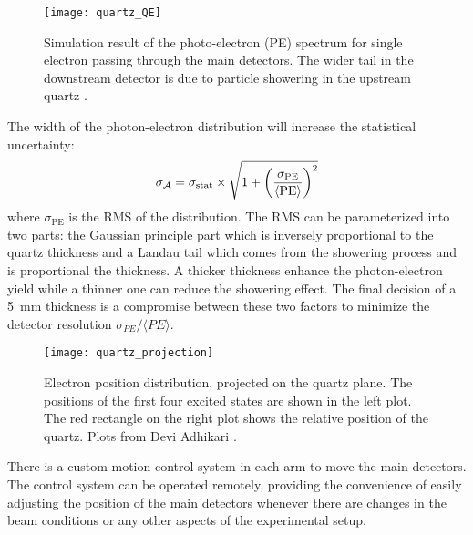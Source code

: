 \begin{figure}[!h]
    \centering
    \texttt{[image: quartz\_QE]}
    \caption[photo-electron spectrum of quartz]
    {Simulation result of the photo-electron (PE) spectrum for single electron
    passing through the main detectors. The wider tail in the downstream
    detector is due to particle showering in the upstream quartz \cite{Devi2021}. 
    }
\end{figure}
The width of the photon-electron distribution will increase the statistical uncertainty:
\begin{equation}
    \sigma_{\mathcal{A}} = \sigma_{\text{stat}} \times \sqrt{1 + \left( \frac{\sigma_{\text{PE}}}{\langle \text{PE} \rangle }\right)^2}
\end{equation}
where $\sigma_{\text{PE}}$ is the RMS of the distribution. The RMS can be parameterized
into two parts: the Gaussian principle part which is inversely proportional to
the quartz thickness and a Landau tail which comes from the showering process
and is proportional the thickness. A thicker thickness enhance the 
photon-electron yield while a thinner one can reduce the showering effect.
The final decision of a 5~mm thickness is a compromise between these two factors 
to minimize the detector resolution $\sigma_{PE}/\langle PE \rangle$. 

\begin{figure}[!h]
    \centering
    \texttt{[image: quartz\_projection]}
    \caption[Electron position distribution, projected on the quartz plane.]
    {Electron position distribution, projected on the quartz plane. 
    The positions of the first four excited states are shown in the left plot. 
    The red rectangle on the right plot shows the relative position of the quartz.
    Plots from Devi Adhikari \cite{Devi2021}.}
\end{figure}

There is a custom motion control system in each arm to move the main detectors.
The control system can be operated remotely, providing the convenience of easily adjusting the position of the main detectors whenever there are changes in the beam conditions or any other aspects of the experimental setup.


